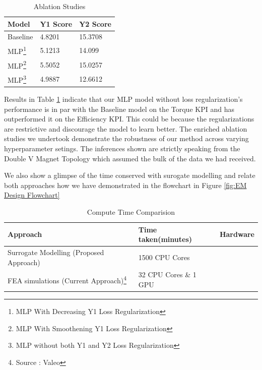 \documentclass{report} %
\begin{document}
\begin{minipage}[t]{\textwidth}
    \begin{table}[H]
        \centering
        \begin{tabular}{|p{}|p{}|p{}|}
        \hline {\bf Model} & {\bf Y1 Score} & {\bf Y2 Score}\\
        \hline 
        Baseline & 4.8201 & 15.3708 \\
        MLP\footnote{MLP With Decreasing Y1 Loss Regularization} & 5.1213 & 14.099 \\
        MLP\footnote{MLP With Smoothening Y1 Loss Regularization} & 5.5052 & 15.0257 \\
        MLP\footnote{MLP without both Y1 and Y2 Loss Regularization} & 4.9887 & 12.6612  \\
        \hline
        \end{tabular}
        \caption{Ablation Studies}
        \label{tab:Ablation Studies}
    \end{table}
\end{minipage}

\vspace{1em} %

Results in Table \ref{tab:Ablation Studies} indicate that our \ac{MLP} model without loss regularization's performance is in par with the 
Baseline model on the Torque \ac{KPI} and has outperformed it on the Efficiency \ac{KPI}.
This could be because the regularizations are restrictive and discourage the model to learn better.
The enriched ablation studies we undertook demonstrate the robustness of our method across varying hyperparameter setings.
The inferences shown are strictly speaking from the Double V Magnet Topology which assumed the bulk of the data we had received.

We also show a glimpse of the time conserved with surogate modelling and relate both approaches how we have demonstrated in the flowchart in Figure \ref{fig:EM Design Flowchart}

\begin{minipage}[t]{\textwidth}
    \begin{table}[H]
        \centering
        \begin{tabular}{|p{}|p{}|p{}|}
        \hline {\bf Approach} & {\bf Time taken(minutes)} & {\bf Hardware}\\
        \hline 
        Surrogate Modelling (Proposed Approach) & 1500 CPU Cores\\
        \ac{FEA} simulations (Current Approach)\footnote{Source : Valeo} & 32 CPU Cores \& 1 GPU\\
        \hline
        \end{tabular}
        \caption{Compute Time Comparision}
        \label{tab:Compute Time Comparisions}
    \end{table}
\end{minipage}
\end{document}

